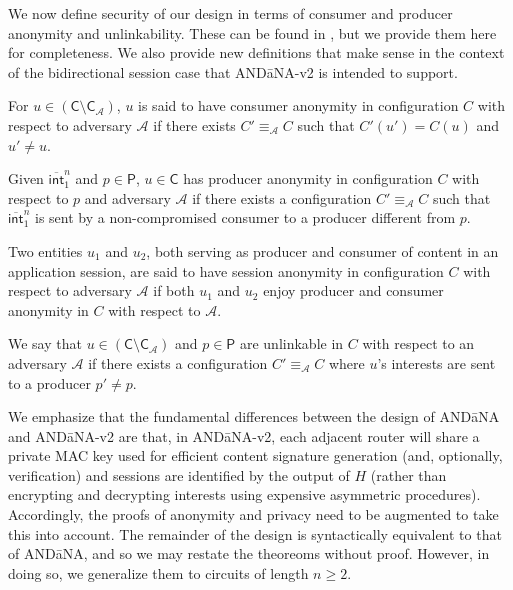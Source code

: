 We now define security of our design in terms of consumer and producer anonymity and unlinkability. These can be found in \cite{andana}, but we provide them here for completeness. We also provide new definitions that make sense in the context of the bidirectional session case that {\sf AND\=aNA-v2} is intended to support.
\begin{defn}
\cite{andana} For $u \in (\mathsf{C} \setminus \mathsf{C}_{\mathcal{A}})$, $u$ is said to have {\sf consumer anonymity} in configuration $C$ with respect to adversary $\mathcal{A}$ if there exists $C' \equiv_{\mathcal{A}} C$ such that $C'(u') = C(u)$ and $u' \not= u$. 
\end{defn}
\begin{defn}
\cite{andana} Given $\overline{\mathsf{int}}_1^n$ and $p \in \mathsf{P}$, $u \in \mathsf{C}$ has {\sf producer anonymity} in configuration $C$ with respect to $p$ and adversary $\mathcal{A}$ if there exists a configuration $C' \equiv_{\mathcal{A}} C$ such that $\overline{\mathsf{int}}_1^n$ is sent by a non-compromised consumer to a producer different from $p$. 
\end{defn}
\begin{defn}
Two entities $u_1$ and $u_2$, both serving as producer and consumer of content in an application session, are said to have {\sf session anonymity} in configuration $C$ with respect to adversary $\mathcal{A}$ if both $u_1$ and $u_2$ enjoy producer and consumer anonymity in $C$ with respect to $\mathcal{A}$.
\end{defn}
\begin{defn}
\cite{andana} We say that $u \in (\mathsf{C} \setminus \mathsf{C}_{\mathcal{A}})$ and $p \in \mathsf{P}$ are {\sf unlinkable} in $C$ with respect to an adversary $\mathcal{A}$ if there exists a configuration $C' \equiv_{\mathcal{A}} C$ where $u$'s interests are sent to a producer $p' \not= p$.
\end{defn}

We emphasize that the fundamental differences between the design of {\sf AND\=aNA} and {\sf AND\=aNA-v2} are that, in {\sf AND\=aNA-v2}, each adjacent router will share a private MAC key used for efficient content signature generation (and, optionally, verification) and sessions are identified by the output of $H$ (rather than encrypting and decrypting interests using expensive asymmetric procedures). Accordingly, the proofs of anonymity and privacy need to be augmented to take this into account. The remainder of the design is syntactically equivalent to that of {\sf AND\=aNA}, and so we may restate the theoreoms without proof. However, in doing so, we generalize them to circuits of length $n \geq 2$. 

